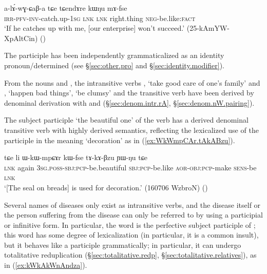 \begin{exe}
\ex \label{ex:kWNu.mAfse}
 \gll  a-lɤ́-wɣ-ɕaβ-a tɕe tɕendɤre kɯŋu mɤ-fse \\
 \textsc{irr}-\textsc{pfv}-\textsc{inv}-catch.up-\textsc{1sg} \textsc{lnk} \textsc{lnk} right.thing \textsc{neg}-be.like:\textsc{fact} \\ 
\glt `If he catches up with me, [our enterprise] won't succeed.' (25-kAmYW-XpAltCin) 	()
\end{exe}

The participle  has been independently grammaticalized as an identity pronoun/determined  (see §\ref{sec:other.pro} and §\ref{sec:identity.modifier}).

From the nouns   and  , the intransitive verbs , `take good care of one's family' and , `happen bad things', `be clumsy' and the transitive verb  have been derived by denominal derivation with  and  (§\ref{sec:denom.intr.rA}, §\ref{sec:denom.nW.pairing}).

The subject participle  `the beautiful one' of the verb  has a derived denominal transitive verb  with highly derived semantics, reflecting the lexicalized use of the participle in the meaning `decoration' as in (\ref{ex:WkWmpCAr.tAkABzu}).

 \begin{exe}
\ex \label{ex:WkWmpCAr.tAkABzu}
 \gll tɕe li ɯ-kɯ-mpɕɤr kɯ-fse tɤ-kɤ-βzu ɲɯ-ŋu tɕe    \\
\textsc{lnk} again \textsc{3sg}.\textsc{poss}-\textsc{sbj}:\textsc{pcp}-be.beautiful \textsc{sbj}:\textsc{pcp}-be.like \textsc{aor}-\textsc{obj}:\textsc{pcp}-make \textsc{sens}-be \textsc{lnk} \\
 \glt `[The seal on breads] is used for decoration.' (160706 WzbroN)
()
\end{exe}

Several names of diseases only exist as intransitive verbs, and the disease itself or the person suffering from the disease can only be referred to by using a participial or infinitive form. In particular, the word  is the perfective subject participle of ; this word has some degree of lexicalization (in particular, it is a common insult), but it behaves like a participle grammatically; in particular, it can undergo totalitative reduplication (§\ref{sec:totalitative.redp}, §\ref{sec:totalitative.relatives}), as in (\ref{ex:kWkAkWnAndza}).


